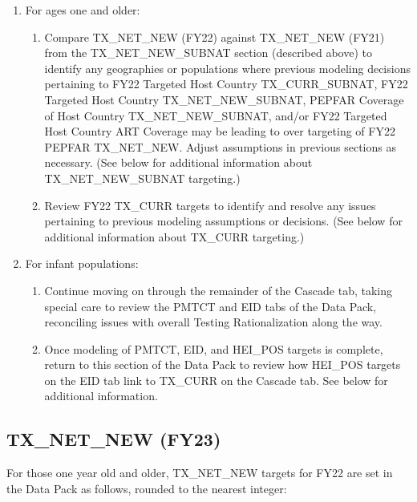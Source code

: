 \documentclass[
  openany]{book}
\begin{document}
\begin{enumerate}
\def\labelenumi{\arabic{enumi}.}
\item
  For ages one and older:

  \begin{enumerate}
  \def\labelenumii{\alph{enumii}.}
  \item
    Compare TX\_NET\_NEW (FY22) against TX\_NET\_NEW (FY21) from the
    TX\_NET\_NEW\_SUBNAT section (described above) to identify any
    geographies or populations where previous modeling decisions
    pertaining to FY22 Targeted Host Country TX\_CURR\_SUBNAT, FY22
    Targeted Host Country TX\_NET\_NEW\_SUBNAT, PEPFAR Coverage of Host
    Country TX\_NET\_NEW\_SUBNAT, and/or FY22 Targeted Host Country ART
    Coverage may be leading to over targeting of FY22 PEPFAR
    TX\_NET\_NEW. Adjust assumptions in previous sections as
    necessary. (See below for additional information about
    TX\_NET\_NEW\_SUBNAT targeting.)
  \item
    Review FY22 TX\_CURR targets to identify and resolve any issues
    pertaining to previous modeling assumptions or decisions. (See
    below for additional information about TX\_CURR targeting.)
  \end{enumerate}
\item
  For infant populations:

  \begin{enumerate}
  \def\labelenumii{\alph{enumii}.}
  \item
    Continue moving on through the remainder of the Cascade tab,
    taking special care to review the PMTCT and EID tabs of the Data
    Pack, reconciling issues with overall Testing Rationalization
    along the way.
  \item
    Once modeling of PMTCT, EID, and HEI\_POS targets is complete,
    return to this section of the Data Pack to review how HEI\_POS
    targets on the EID tab link to TX\_CURR on the Cascade tab. See
    below for additional information.
  \end{enumerate}
\end{enumerate}

\hypertarget{tx_net_new-fy23}{%
\subsection{TX\_NET\_NEW (FY23)}\label{tx_net_new-fy23}}

For those one year old and older, TX\_NET\_NEW targets for FY22 are set in
the Data Pack as follows, rounded to the nearest integer:
\end{document}
